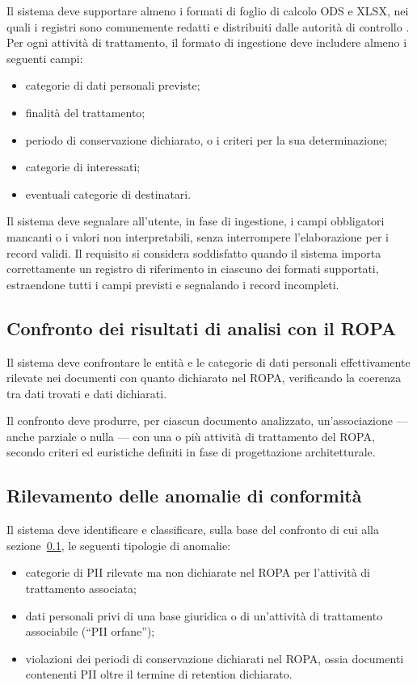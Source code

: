 Il sistema deve supportare almeno i formati di foglio di calcolo ODS e XLSX, nei quali i registri sono comunemente redatti e distribuiti dalle autorità di controllo \cite{cnilRegistreModeleBasique}. Per ogni attività di trattamento, il formato di ingestione deve includere almeno i seguenti campi:
\begin{itemize}
	\item categorie di dati personali previste;
	\item finalità del trattamento;
	\item periodo di conservazione dichiarato, o i criteri per la sua determinazione;
	\item categorie di interessati;
	\item eventuali categorie di destinatari.
\end{itemize} \medskip

Il sistema deve segnalare all'utente, in fase di ingestione, i campi obbligatori mancanti o i valori non interpretabili, senza interrompere l'elaborazione per i record validi. Il requisito si considera soddisfatto quando il sistema importa correttamente un registro di riferimento in ciascuno dei formati supportati, estraendone tutti i campi previsti e segnalando i record incompleti.

\subsection{Confronto dei risultati di analisi con il ROPA}
\label{sub:confronto-ropa}
Il sistema deve confrontare le entità e le categorie di dati personali effettivamente rilevate nei documenti con quanto dichiarato nel ROPA, verificando la coerenza tra dati trovati e dati dichiarati. \medskip

Il confronto deve produrre, per ciascun documento analizzato, un'associazione --- anche parziale o nulla --- con una o più attività di trattamento del ROPA, secondo criteri ed euristiche definiti in fase di progettazione architetturale.

\subsection{Rilevamento delle anomalie di conformità}
\label{sub:rilevamento-anomalie}
Il sistema deve identificare e classificare, sulla base del confronto di cui alla sezione~\ref{sub:confronto-ropa}, le seguenti tipologie di anomalie:
\begin{itemize}
	\item categorie di PII rilevate ma non dichiarate nel ROPA per l'attività di trattamento associata;
	\item dati personali privi di una base giuridica o di un'attività di trattamento associabile (``PII orfane'');
	\item violazioni dei periodi di conservazione dichiarati nel ROPA, ossia documenti contenenti PII oltre il termine di retention dichiarato.
\end{itemize} \medskip

